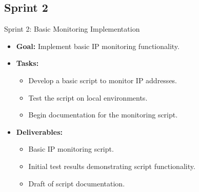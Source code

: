 \documentclass[11pt,a4paper]{article}
\begin{document}
    \subsection{Sprint 2}\label{subsec:sprint-2}
    \begin{frame}{Sprint 2: Basic Monitoring Implementation}
        \begin{itemize}
            \item \textbf{Goal:} Implement basic IP monitoring functionality.
            \item \textbf{Tasks:}
            \begin{itemize}
                \item Develop a basic script to monitor IP addresses.
                \item Test the script on local environments.
                \item Begin documentation for the monitoring script.
            \end{itemize}
            \item \textbf{Deliverables:}
            \begin{itemize}
                \item Basic IP monitoring script.
                \item Initial test results demonstrating script functionality.
                \item Draft of script documentation.
            \end{itemize}
        \end{itemize}
    \end{frame}
\end{document}
